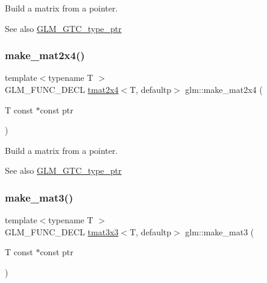 Build a matrix from a pointer. \begin{DoxySeeAlso}{See also}
\hyperlink{group__gtc__type__ptr}{G\+L\+M\+\_\+\+G\+T\+C\+\_\+type\+\_\+ptr} 
\end{DoxySeeAlso}
\mbox{\label{group__gtc__type__ptr_ga6dfb2ac10859b0cc8e3893ea84fa95b5}} 
\subsubsection{\texorpdfstring{make\+\_\+mat2x4()}{make\_mat2x4()}}
{\footnotesize\ttfamily template$<$typename T $>$ \\
G\+L\+M\+\_\+\+F\+U\+N\+C\+\_\+\+D\+E\+CL \hyperlink{structglm_1_1tmat2x4}{tmat2x4}$<$T, defaultp$>$ glm\+::make\+\_\+mat2x4 (\begin{DoxyParamCaption}\item[{T const $\ast$const}]{ptr }\end{DoxyParamCaption})}

Build a matrix from a pointer. \begin{DoxySeeAlso}{See also}
\hyperlink{group__gtc__type__ptr}{G\+L\+M\+\_\+\+G\+T\+C\+\_\+type\+\_\+ptr} 
\end{DoxySeeAlso}
\mbox{\label{group__gtc__type__ptr_gac2bc10c519ffc8db9e24f325f23787ea}} 
\subsubsection{\texorpdfstring{make\+\_\+mat3()}{make\_mat3()}}
{\footnotesize\ttfamily template$<$typename T $>$ \\
G\+L\+M\+\_\+\+F\+U\+N\+C\+\_\+\+D\+E\+CL \hyperlink{structglm_1_1tmat3x3}{tmat3x3}$<$T, defaultp$>$ glm\+::make\+\_\+mat3 (\begin{DoxyParamCaption}\item[{T const $\ast$const}]{ptr }\end{DoxyParamCaption})}

